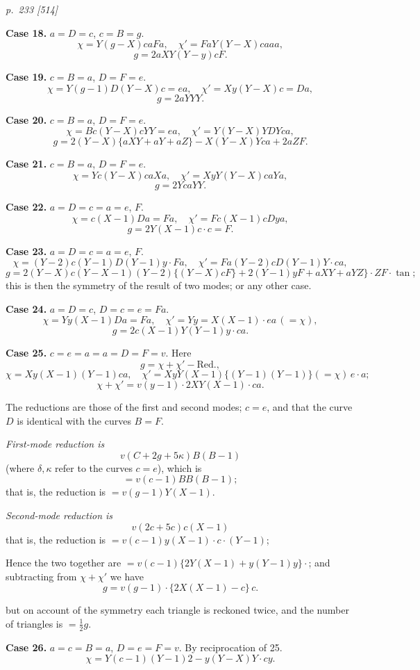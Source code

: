 \documentclass[11pt,a4paper]{article}
\theoremstyle{plain}
\theoremstyle{definition}
\begin{document}
\bigskip
\textit{p.~233 [514]}
\smallskip

\textbf{Case 18.}  $a=D=c$, $c=B=g$.
\[
\chi=Y(g-X)caFa, \quad \chi'=FaY(Y-X)caaa,
\]
\[
g=2aXY(Y-y)cF.
\]

\textbf{Case 19.}  $c=B=a$, $D=F=e$.
\[
\chi=Y(g-1)D(Y-X)c=ea, \quad \chi'=Xy(Y-X)c=Da,
\]
\[
g=2aYYY.
\]

\textbf{Case 20.}  $c=B=a$, $D=F=e$.
\[
\chi=Bc(Y-X)cYY=ea, \quad \chi'=Y(Y-X)YDYca,
\]
\[
g=2(Y-X)\{aXY+aY+aZ\}-X(Y-X)Yca+2aZF.
\]

\textbf{Case 21.}  $c=B=a$, $D=F=e$.
\[
\chi=Yc(Y-X)caXa, \quad \chi'=XyY(Y-X)caYa,
\]
\[
g=2YcaYY.
\]

\textbf{Case 22.}  $a=D=c=a=e$, $F$.
\[
\chi=c(X-1)Da=Fa, \quad \chi'=Fc(X-1)cDya,
\]
\[
g=2Y(X-1)c\cdot c=F.
\]

\textbf{Case 23.}  $a=D=c=a=e$, $F$.
\[
\chi=(Y-2)c(Y-1)D(Y-1)y\cdot Fa, \quad \chi'=Fa(Y-2)cD(Y-1)Y\cdot ca,
\]
\[
g=2(Y-X)c(Y-X-1)(Y-2)\{(Y-X)cF\}+2(Y-1)yF+aXY+aYZ\}\cdot ZF\cdot \tan;
\]
this is then the symmetry of the result of two modes; or any other case.

\textbf{Case 24.}  $a=D=c$, $D=c=e=Fa$.
\[
\chi=Yy(X-1)Da=Fa, \quad \chi'=Yy=X(X-1)\cdot ea\,(=\chi),
\]
\[
g=2c(X-1)Y(Y-1)y\cdot ca.
\]

\textbf{Case 25.}  $c=e=a=a=D=F=v$.  Here
\[
g=\chi+\chi'-\text{Red.},
\]
\[
\chi=Xy(X-1)(Y-1)ca, \quad \chi'=XyY(X-1)\{(Y-1)(Y-1)\}(=\chi)\,e\cdot a;
\]
\[
\chi+\chi'=v(y-1)\cdot 2XY(X-1)\cdot ca.
\]

The reductions are those of the first and second modes; $c=e$, and that the curve $D$
is identical with the curves $B=F$.

\textit{First-mode reduction is}
\[
v(C+2g+5\kappa)B(B-1)
\]
(where $\delta, \kappa$ refer to the curves $c=e$), which is
\[
=v(c-1)BB(B-1);
\]
that is, the reduction is $=v(g-1)Y(X-1)$.

\textit{Second-mode reduction is}
\[
v(2c+5c)c(X-1)
\]
that is, the reduction is $=v(c-1)y(X-1)\cdot c\cdot (Y-1)$;

Hence the two together are $=v(c-1)\{2Y(X-1)+y(Y-1)y\}\cdot$; and subtracting from
$\chi+\chi'$ we have
\[
g=v(g-1)\cdot \{2X(X-1)-c\}\,c.
\]

but on account of the symmetry each triangle is reckoned twice, and the number of
triangles is $=\frac{1}{2}g$.

\textbf{Case 26.}  $a=c=B=a$, $D=e=F=v$.  By reciprocation of 25.
\[
\chi=Y(c-1)(Y-1)2-y(Y-X)Y\cdot cy.
\]
\end{document}
